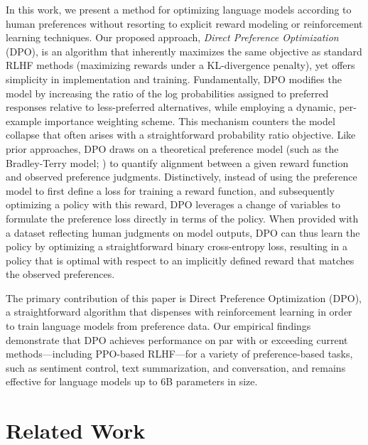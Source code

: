 In this work, we present a method for optimizing language models according to human preferences without resorting to explicit reward modeling or reinforcement learning techniques. Our proposed approach, \textit{Direct Preference Optimization} (DPO), is an algorithm that inherently maximizes the same objective as standard RLHF methods (maximizing rewards under a KL-divergence penalty), yet offers simplicity in implementation and training. Fundamentally, DPO modifies the model by increasing the ratio of the log probabilities assigned to preferred responses relative to less-preferred alternatives, while employing a dynamic, per-example importance weighting scheme. This mechanism counters the model collapse that often arises with a straightforward probability ratio objective. Like prior approaches, DPO draws on a theoretical preference model (such as the Bradley-Terry model; \cite{bradley1952rankanalysis}) to quantify alignment between a given reward function and observed preference judgments. Distinctively, instead of using the preference model to first define a loss for training a reward function, and subsequently optimizing a policy with this reward, DPO leverages a change of variables to formulate the preference loss directly in terms of the policy. When provided with a dataset reflecting human judgments on model outputs, DPO can thus learn the policy by optimizing a straightforward binary cross-entropy loss, resulting in a policy that is optimal with respect to an implicitly defined reward that matches the observed preferences.

The primary contribution of this paper is Direct Preference Optimization (DPO), a straightforward algorithm that dispenses with reinforcement learning in order to train language models from preference data. Our empirical findings demonstrate that DPO achieves performance on par with or exceeding current methods—including PPO-based RLHF—for a variety of preference-based tasks, such as sentiment control, text summarization, and conversation, and remains effective for language models up to 6B parameters in size.

\section{Related Work}

